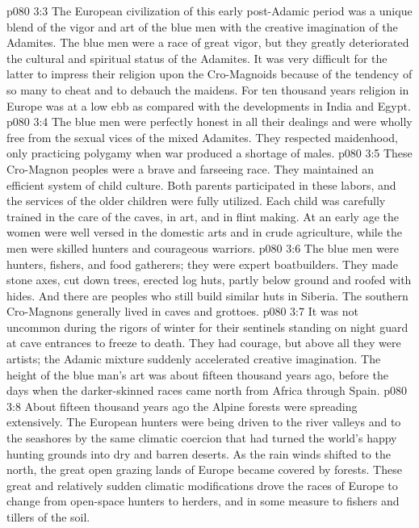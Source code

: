 \vs p080 3:3 The European civilization of this early post\hyp{}Adamic period was a unique blend of the vigor and art of the blue men with the creative imagination of the Adamites. The blue men were a race of great vigor, but they greatly deteriorated the cultural and spiritual status of the Adamites. It was very difficult for the latter to impress their religion upon the Cro\hyp{}Magnoids because of the tendency of so many to cheat and to debauch the maidens. For ten thousand years religion in Europe was at a low ebb as compared with the developments in India and Egypt.
\vs p080 3:4 The blue men were perfectly honest in all their dealings and were wholly free from the sexual vices of the mixed Adamites. They respected maidenhood, only practicing polygamy when war produced a shortage of males.
\vs p080 3:5 These Cro\hyp{}Magnon peoples were a brave and farseeing race. They maintained an efficient system of child culture. Both parents participated in these labors, and the services of the older children were fully utilized. Each child was carefully trained in the care of the caves, in art, and in flint making. At an early age the women were well versed in the domestic arts and in crude agriculture, while the men were skilled hunters and courageous warriors.
\vs p080 3:6 The blue men were hunters, fishers, and food gatherers; they were expert boatbuilders. They made stone axes, cut down trees, erected log huts, partly below ground and roofed with hides. And there are peoples who still build similar huts in Siberia. The southern Cro\hyp{}Magnons generally lived in caves and grottoes.
\vs p080 3:7 It was not uncommon during the rigors of winter for their sentinels standing on night guard at cave entrances to freeze to death. They had courage, but above all they were artists; the Adamic mixture suddenly accelerated creative imagination. The height of the blue man’s art was about fifteen thousand years ago, before the days when the darker\hyp{}skinned races came north from Africa through Spain.
\vs p080 3:8 \pc About fifteen thousand years ago the Alpine forests were spreading extensively. The European hunters were being driven to the river valleys and to the seashores by the same climatic coercion that had turned the world’s happy hunting grounds into dry and barren deserts. As the rain winds shifted to the north, the great open grazing lands of Europe became covered by forests. These great and relatively sudden climatic modifications drove the races of Europe to change from open\hyp{}space hunters to herders, and in some measure to fishers and tillers of the soil.
